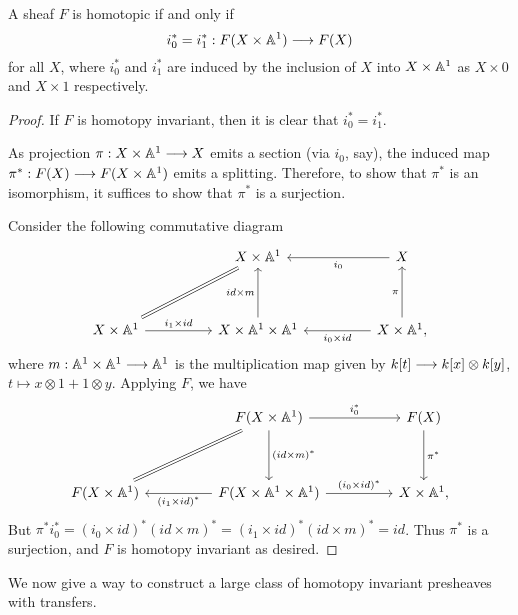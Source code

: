\begin{lem}
A sheaf $F$ is homotopic if and only if
\[
i_0^* = i_1^* : F(X \times \mathbb{A}^1) \longrightarrow F(X)
\]
for all $X$, where $i_0^*$ and $i_1^*$ are induced by the 
inclusion of $X$ into $X \times \mathbb{A}^1$ as $X \times 0$ and $X 
\times 1$ respectively.
\end{lem}
\begin{proof}
If $F$ is homotopy invariant, then it is clear that $i_0^* = 
i_1^*$.

As projection $\pi: X \times \mathbb{A}^1 \longrightarrow X$ emits a section (via $i_0$, 
say), the induced map $\pi^*: F(X) \longrightarrow F(X \times \mathbb{A}^1)$ emits a
splitting. Therefore, to show that $\pi^*$ is an isomorphism, it
suffices to show that $\pi^*$ is a surjection.

Consider the following commutative diagram
\[
\begin{tikzcd}[row sep=huge, column sep=huge]
{}&
X \times \A^1&
X \arrow{l}{i_0}\\
X \times \A^1 \arrow[equals]{ru} \arrow{r}{i_1 \times id}&
X \times \A^1 \times \A^1 \arrow{u}{id \times m} &
X \times \A^1 \arrow{l}{i_0 \times id} \arrow{u}{\pi},
\end{tikzcd}
\]
where $m: \mathbb{A}^1 \times \mathbb{A}^1 \longrightarrow \mathbb{A}^1$ is the multiplication map
given by $k [t] \longrightarrow k [x] \otimes k 
[y]$, $t \mapsto x \otimes 1 + 1 \otimes y$. Applying $F$, we
have
\[
\begin{tikzcd}[row sep=huge, column sep=huge]
{}&
F(X \times \A^1) \arrow{r}{i_0^*}\arrow[equals]{ld}
   \arrow{d}{(id \times m)^*}&
F(X) \arrow{d}{\pi^*} \\
F(X \times \A^1)&
F(X \times \A^1 \times \A^1) \arrow{l}{(i_1 \times id)^*} 
   \arrow{r}{(i_0 \times id)^*}&
X \times \A^1,
\end{tikzcd}
\]
But $\pi^*i_0^* = (i_0 \times id)^*(id \times m)^* =
(i_1 \times id)^*(id \times m)^* = id$. Thus $\pi^*$ is a 
surjection, and $F$ is homotopy invariant as desired.
\end{proof}

We now give a way to construct a large class of homotopy invariant
presheaves with transfers.

